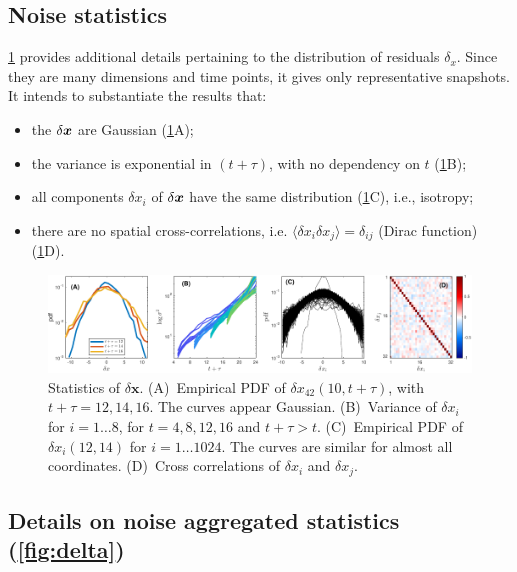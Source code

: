 \documentclass{article} %
\begin{document}
\subsection{Noise statistics}
\label{app:noise-stat}
\cref{fig:noise-details} provides additional details pertaining to the distribution of residuals $\delta_x$. 
Since they are many dimensions and time points, it gives only representative snapshots.
It intends to substantiate the results that:
\begin{itemize}
    \item the $\delta {\bm{x}}$ are Gaussian (\cref{fig:noise-details}A);
    \item the variance is exponential in $(t+\tau)$, with no dependency on $t$ (\cref{fig:noise-details}B);
    \item all components $\delta x_i$ of $\delta {\bm{x}}$ have the same distribution (\cref{fig:noise-details}C), i.e., isotropy;
    \item there are no spatial cross-correlations, i.e. $\langle \delta x_i \delta x_j \rangle = \delta_{ij}$ (Dirac function) (\cref{fig:noise-details}D).
\end{itemize} 

\begin{figure}[htbp]
\vskip 0.2in
\begin{center}
\centerline{\includegraphics[width=\columnwidth]{fig/figS_noise_details_v01.pdf}}
\caption{
Statistics of $\delta \mathbf{x}$.
(A)~Empirical PDF of $\delta x_{42}(10,t+\tau)$, with $t+\tau = 12, 14, 16$.
The curves appear Gaussian.
(B)~Variance of $\delta x_i$ for $i = 1 \dots 8$, for $t = 4,8,12,16$ and $t+\tau > t$.
(C)~Empirical PDF of $\delta x_i (12, 14)$ for $i=1 \dots 1024$. The curves are similar for almost all coordinates.
(D)~Cross correlations of $\delta x_i$ and $\delta x_j$.
}
\label{fig:noise-details}
\end{center}
\vskip -0.2in
\end{figure}


\subsection{Details on noise aggregated statistics (\cref{fig:delta})}
\end{document}
